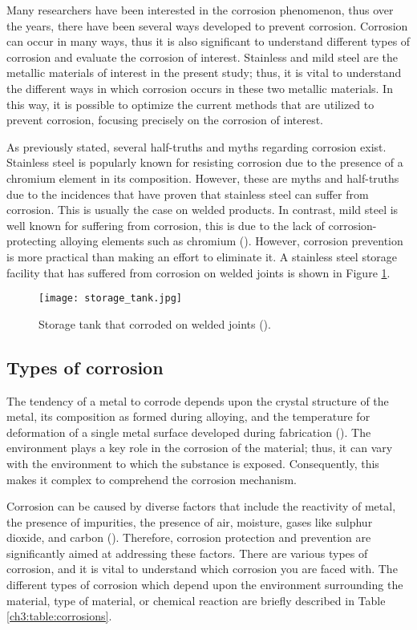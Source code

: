 Many researchers have been interested in the corrosion phenomenon, thus over the years, there have been several ways developed to prevent corrosion. Corrosion can occur in many ways, thus it is also significant to understand different types of corrosion and evaluate the corrosion of interest. Stainless and mild steel are the metallic materials of interest in the present study; thus, it is vital to understand the different ways in which corrosion occurs in these two metallic materials. In this way, it is possible to optimize the current methods that are utilized to prevent corrosion, focusing precisely on the corrosion of interest.

As previously stated, several half-truths and myths regarding corrosion exist. Stainless steel is popularly known for resisting corrosion due to the presence of a chromium element in its composition. However, these are myths and half-truths due to the incidences that have proven that stainless steel can suffer from corrosion. This is usually the case on welded products. In contrast, mild steel is well known for suffering from corrosion, this is due to the lack of corrosion-protecting alloying elements such as chromium (\cite{hackerman1987theory}). However, corrosion prevention is more practical than making an effort to eliminate it. A stainless steel storage facility that has suffered from corrosion on welded joints is shown in Figure \ref{ch3:figure:tank}.
 
\begin{figure}[H]
    \centering
    \texttt{[image: storage\_tank.jpg]}
    \caption{Storage tank that corroded on welded joints (\cite{karayan2014weld}).}
    \label{ch3:figure:tank}
\end{figure}

\subsection{Types of corrosion} 
The tendency of a metal to corrode depends upon the crystal structure of the metal, its composition as formed during alloying, and the temperature for deformation of a single metal surface developed during fabrication (\cite{sourmail2005stainless}). The environment plays a key role in the corrosion of the material; thus, it can vary with the environment to which the substance is exposed. Consequently, this makes it complex to comprehend the corrosion mechanism.

Corrosion can be caused by diverse factors that include the reactivity of metal, the presence of impurities, the presence of air, moisture, gases like sulphur dioxide, and carbon (\cite{sourmail2005stainless}). Therefore, corrosion protection and prevention are significantly aimed at addressing these factors. There are various types of corrosion, and it is vital to understand which corrosion you are faced with. The different types of corrosion which depend upon the environment surrounding the material, type of material, or chemical reaction are briefly described in Table \ref{ch3:table:corrosions}.

